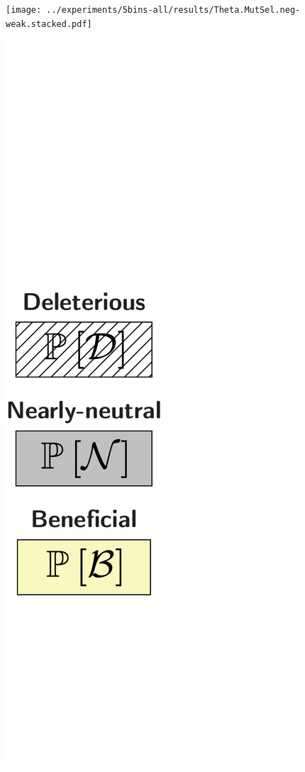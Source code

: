 \documentclass{article}
\begin{document}
\begin{center}
\begin{minipage}{0.09\linewidth}
        \end{minipage}
        \begin{minipage}{0.9\linewidth}
            \texttt{[image: ../experiments/5bins-all/results/Theta.MutSel.neg-weak.stacked.pdf]} \\
        \end{minipage}
        \begin{minipage}{0.09\linewidth}
            \includegraphics[width=\linewidth, page=1]{artworks/legend.polycat}

\end{minipage}
\end{center}
\end{document}

